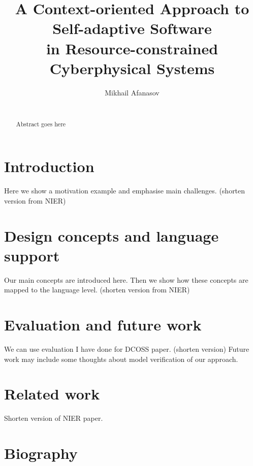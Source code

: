 \documentclass{sig-alternate}
\begin{document}
\title{A Context-oriented Approach to Self-adaptive Software\\ in Resource-constrained Cyberphysical Systems}


\author{
%
%
\alignauthor
Mikhail Afanasov \\
       \\
}


\maketitle

\begin{abstract}
Abstract goes here
\end{abstract}

\section{Introduction}
Here we show a motivation example and emphasise main challenges. (shorten
version from NIER)

\section{Design concepts and language support}
Our main concepts are introduced here. Then we show how these concepts are
mapped to the language level. (shorten version from NIER)

\section{Evaluation and future work}
We can use evaluation I have done for DCOSS paper. (shorten version)
Future work may include some thoughts about model verification of our approach.

\section{Related work}
Shorten version of NIER paper.

\section{Biography}

\end{document}

